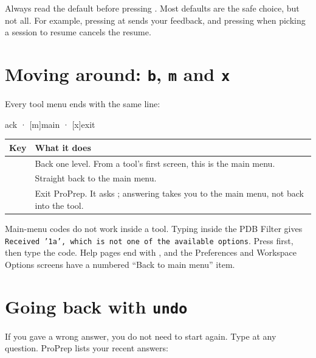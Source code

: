 \begin{watchout}
Always read the default before pressing . Most defaults are the safe
choice, but not all. For example, pressing  at
 sends your feedback,
and pressing  when picking a session to resume cancels the resume.
\end{watchout}

\section{Moving around: \texttt{b}, \texttt{m} and \texttt{x}}\label{sec:menus-nav}

Every tool menu ends with the same line:

\begin{screen}
[b]ack · [m]main · [x]exit
\end{screen}

\begin{tabularx}{\linewidth}{@{}lL@{}}
\toprule
\textbf{Key} & \textbf{What it does} \\
\midrule
{} & Back one level. From a tool's first screen, this is the main menu. \\
 & Straight back to the main menu. \\
 & Exit ProPrep. It asks ;
answering  takes you to the main menu, not back into the tool. \\
\bottomrule
\end{tabularx}

\medskip
Main-menu codes do not work inside a tool. Typing  inside the PDB
Filter gives \texttt{Received '1a', which is not one of the available options}.
Press  first, then type the code. Help pages end with
, and the Preferences and Workspace
Options screens have a numbered ``Back to main menu'' item.

\section{Going back with \texttt{undo}}\label{sec:menus-undo}

If you gave a wrong answer, you do not need to start again. Type  at
any question. ProPrep lists your recent answers:

